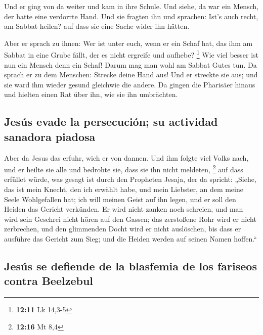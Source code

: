  Und er ging von da weiter und kam in ihre Schule.
 Und siehe, da war ein Mensch, der hatte eine verdorrte
Hand. Und sie fragten ihn und sprachen: Ist's auch recht, am Sabbat
heilen? auf dass sie eine Sache wider ihn hätten.

 Aber er sprach zu ihnen: Wer ist unter euch, wenn er ein
Schaf hat, das ihm am Sabbat in eine Grube fällt, der es nicht ergreife
und aufhebe? \footnote{\textbf{12:11} Lk 14,3-5}  Wie
viel besser ist nun ein Mensch denn ein Schaf! Darum mag man wohl am
Sabbat Gutes tun.  Da sprach er zu dem Menschen: Strecke
deine Hand aus! Und er streckte sie aus; und sie ward ihm wieder gesund
gleichwie die andere.  Da gingen die Pharisäer hinaus und
hielten einen Rat über ihn, wie sie ihn umbrächten.

\hypertarget{jesuxfas-evade-la-persecuciuxf3n-su-actividad-sanadora-piadosa}{%
\subsection{Jesús evade la persecución; su actividad sanadora
piadosa}\label{jesuxfas-evade-la-persecuciuxf3n-su-actividad-sanadora-piadosa}}

 Aber da Jesus das erfuhr, wich er von dannen. Und ihm
folgte viel Volks nach, und er heilte sie alle  und
bedrohte sie, dass sie ihn nicht meldeten, \footnote{\textbf{12:16} Mt
  8,4}  auf dass erfüllet würde, was gesagt ist durch den
Propheten Jesaja, der da spricht:  „Siehe, das ist mein
Knecht, den ich erwählt habe, und mein Liebster, an dem meine Seele
Wohlgefallen hat; ich will meinen Geist auf ihn legen, und er soll den
Heiden das Gericht verkünden.  Er wird nicht zanken noch
schreien, und man wird sein Geschrei nicht hören auf den Gassen;
 das zerstoßene Rohr wird er nicht zerbrechen, und den
glimmenden Docht wird er nicht auslöschen, bis dass er ausführe das
Gericht zum Sieg;  und die Heiden werden auf seinen Namen
hoffen.``

\hypertarget{jesuxfas-se-defiende-de-la-blasfemia-de-los-fariseos-contra-beelzebul}{%
\subsection{Jesús se defiende de la blasfemia de los fariseos contra
Beelzebul}\label{jesuxfas-se-defiende-de-la-blasfemia-de-los-fariseos-contra-beelzebul}}

